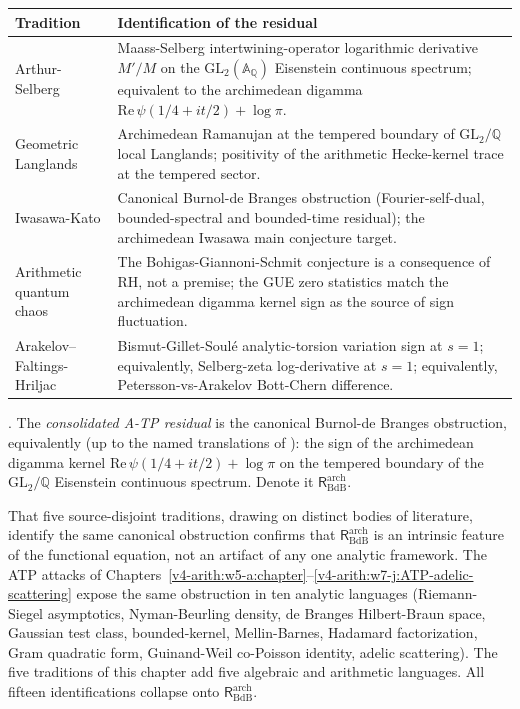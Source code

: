 \begin{center}
\small
\begin{tabular}{lp{7cm}}
\toprule
Tradition & Identification of the residual \\
\midrule
Arthur-Selberg & Maass-Selberg intertwining-operator logarithmic
derivative \(M'/M\) on the
\(\mathrm{GL}_2(\mathbb{A}_{\mathbb{Q}})\) Eisenstein continuous
spectrum; equivalent to the archimedean digamma
\(\mathrm{Re}\,\psi(1/4+it/2)+\log\pi\). \\
Geometric Langlands & Archimedean Ramanujan at the tempered
boundary of \(\mathrm{GL}_2/\mathbb{Q}\) local Langlands; positivity of
the arithmetic Hecke-kernel trace at the tempered sector. \\
Iwasawa-Kato & Canonical Burnol-de Branges obstruction
(Fourier-self-dual, bounded-spectral and bounded-time residual);
the archimedean Iwasawa main conjecture target. \\
Arithmetic quantum chaos & The Bohigas-Giannoni-Schmit conjecture is
a consequence of RH, not a premise; the GUE zero statistics match the
archimedean digamma kernel sign as the source of sign fluctuation. \\
Arakelov--Faltings-Hriljac &
Bismut-Gillet-Soul\'{e} analytic-torsion variation sign at \(s=1\);
equivalently, Selberg-zeta log-derivative at \(s=1\); equivalently,
Petersson-vs-Arakelov Bott-Chern difference. \\
\bottomrule
\end{tabular}
\end{center}

\begin{definition}
\label{v4-arith:w8-atp:defn:consolidated-residual}
\ClaimStatusDefinitional. The \emph{consolidated A-TP residual} is the
canonical Burnol-de Branges obstruction, equivalently (up to the
named translations of ): the
sign of the archimedean digamma kernel
\(\mathrm{Re}\,\psi(1/4+it/2)+\log\pi\) on the tempered boundary of the
\(\mathrm{GL}_2/\mathbb{Q}\) Eisenstein continuous spectrum. Denote it
\(\mathsf{R}^{\mathrm{arch}}_{\mathrm{BdB}}\).
\end{definition}

\begin{remark}
\label{v4-arith:w8-atp:rem:fivefold}
That five source-disjoint traditions, drawing on distinct bodies of
literature, identify the same canonical obstruction confirms that
\(\mathsf{R}^{\mathrm{arch}}_{\mathrm{BdB}}\) is an intrinsic feature
of the functional equation, not an artifact of any one analytic
framework. The ATP attacks of
Chapters~\ref{v4-arith:w5-a:chapter}--\ref{v4-arith:w7-j:ATP-adelic-scattering}
expose the same obstruction in ten analytic languages (Riemann-Siegel
asymptotics, Nyman-Beurling density, de Branges Hilbert-Braun space,
Gaussian test class, bounded-kernel, Mellin-Barnes, Hadamard
factorization, Gram quadratic form, Guinand-Weil co-Poisson identity,
adelic scattering). The five traditions of this chapter add five
algebraic and arithmetic languages. All fifteen identifications
collapse onto \(\mathsf{R}^{\mathrm{arch}}_{\mathrm{BdB}}\).
\end{remark}

